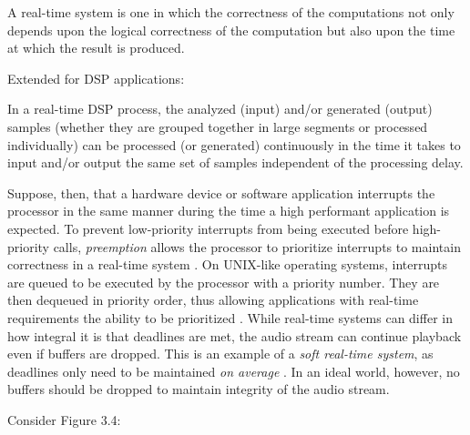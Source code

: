 \begin{defn}\label{def3}
\hfill \break
A real-time system is one in which the correctness of the computations not
only depends upon the logical correctness of the computation but also upon
the time at which the result is produced.

\begin{center}
\hspace*{-10.8cm}\textnormal{Extended for DSP applications:}
\end{center}

\hspace*{-0.6cm}In a real-time DSP process, the analyzed (input) and/or generated (output)
samples (whether they are grouped together in large segments or processed
individually) can be processed (or generated) continuously in the time it
takes to input and/or output the same set of samples independent of the
processing delay.

\end{defn}

Suppose, then, that a hardware device or software application interrupts the processor in the same manner during the time a high performant application is expected. To prevent low-priority interrupts from being executed before high-priority calls, \textit{preemption} allows the processor to prioritize interrupts to maintain correctness in a real-time system \cite{realtime-linux}. On UNIX-like operating systems, interrupts are queued to be executed by the processor with a priority number. They are then dequeued in priority order, thus allowing applications with real-time requirements the ability to be prioritized \cite{posix4}. While real-time systems can differ in how integral it is that deadlines are met, the audio stream can continue playback even if buffers are dropped. This is an example of a \textit{soft real-time system}, as deadlines only need to be maintained \textit{on average} \cite{realtime-linux}. In an ideal world, however, no buffers should be dropped to maintain integrity of the audio stream.

Consider Figure 3.4:

